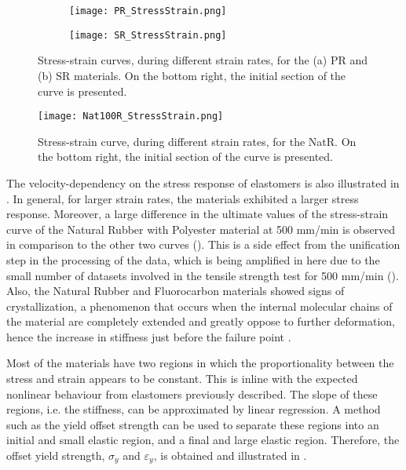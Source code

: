\newpage
\begin{figure}[H]
    \vspace{-2em}
    \centering
    \begin{subfigure}[b]{0.93\textwidth}
    \centering
    \texttt{[image: PR\_StressStrain.png]}
    \caption{}
    \label{fig:PRSS}
    \end{subfigure}

    \begin{subfigure}[b]{0.93\textwidth}
    \centering
    \texttt{[image: SR\_StressStrain.png]}
    \caption{}
    \label{fig:SRSS}
    \end{subfigure}
    \caption{Stress-strain curves, during different strain rates, for the (a) PR and (b) SR materials. On the bottom right, the initial section of the curve is presented.}
    \label{fig:PR-SRSS}
\end{figure}
\newpage
\begin{figure}[H]
    \vspace*{-2em}
    \centering
    \texttt{[image: Nat100R\_StressStrain.png]}
    \caption{Stress-strain curve, during different strain rates, for the NatR. On the bottom right, the initial section of the curve is presented.}
    \label{fig:Nat100RSS}
\end{figure}
\vspace*{-1em}
The velocity-dependency on the stress response of elastomers is also illustrated in . In general, for larger strain rates, the materials exhibited a larger stress response. Moreover, a large difference in the ultimate values of the stress-strain curve of the Natural Rubber with Polyester material at 500 mm/min is observed in comparison to the other two curves (). This is a side effect from the unification step in the processing of the data, which is being amplified in here due to the small number of datasets involved in the tensile strength test for 500 mm/min (). Also, the Natural Rubber and Fluorocarbon materials showed signs of crystallization, a phenomenon that occurs when the internal molecular chains of the material are completely extended and greatly oppose to further deformation, hence the increase in stiffness just before the failure point \cite{Bauman2008}. 

Most of the materials have two regions in which the proportionality between the stress and strain appears to be constant. This is inline with the expected nonlinear behaviour from elastomers previously described. The slope of these regions, i.e. the stiffness, can be approximated by linear regression. A method such as the yield offset strength can be used to separate these regions into an initial and small elastic region, and a final and large elastic region. Therefore, the offset yield strength, $\sigma_y$ and $\varepsilon_y$, is obtained and illustrated in .

